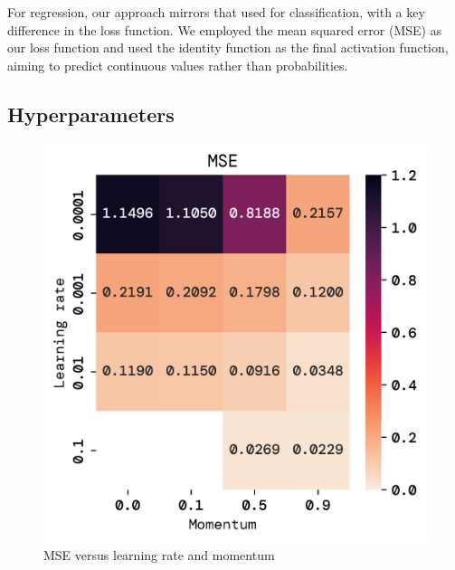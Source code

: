 \documentclass[twoside,11pt]{report}
\begin{document}
    For regression, our approach mirrors that used for classification, with a key difference in the loss function. 
    We employed the mean squared error (MSE) as our loss function and used the identity function as the final 
    activation function, aiming to predict continuous values rather than probabilities.

\subsection*{Hyperparameters}
\label{sec:hyperparameters2}


    \begin{figure}[!ht]
        \begin{minipage}[t]{0.5\textwidth - 1mm}
            \begin{center}
                \includegraphics[width=\textwidth]{../runsAndFigures/MSE_lr_gamma.png}
            \end{center}
            \caption{MSE versus learning rate and momentum
            }\label{fig:MSE_lr_gamma}
        \end{minipage}
        \hspace{2mm}
        \begin{minipage}[t]{0.5\textwidth - 1mm}
            \begin{center}

\end{center}
\end{minipage}
\end{figure}
\end{document}

